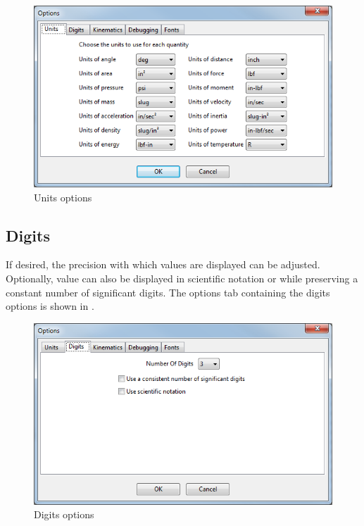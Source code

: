 \begin{figure}
\includegraphics[width=\textwidth]{images/optionsUnits}
\caption{Units options} \label{fig:optionsUnits}
\centering
\end{figure}

\subsection{Digits} \label{ssec:optionsDigits}

If desired, the precision with which values are displayed can be adjusted.  Optionally, value can also be displayed in scientific notation or while preserving a constant number of significant digits.  The options tab containing the digits options is shown in .

\begin{figure}
\includegraphics[width=\textwidth]{images/optionsDigits}
\caption{Digits options} \label{fig:optionsDigits}
\centering
\end{figure}

